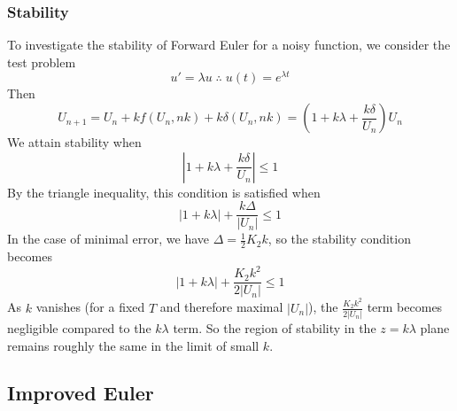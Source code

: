\documentclass[letterpaper,11pt]{article}
\newcommand*{\abs}[1]{\left| #1 \right|}
\begin{document}
\begin{flushleft}
    \subsubsection{Stability}
    To investigate the stability of Forward Euler for a noisy function, we consider the test problem
    $$u' = \lambda u \; \therefore \; u(t) = e^{\lambda t}$$
    Then
    $$U_{n+1} = U_n + kf(U_n, nk) + k\delta(U_n, nk) = \left(1 + k\lambda + \frac{k\delta}{U_n}\right)U_n$$
    We attain stability when
    $$\abs{1 + k\lambda + \frac{k\delta}{U_n}} \leq 1$$
    By the triangle inequality, this condition is satisfied when
    $$\boxed{\abs{1 + k\lambda} + \frac{k\Delta}{\abs{U_n}} \leq 1}$$
    In the case of minimal error, we have $\Delta = \frac{1}{2}K_2 k$, so the stability condition becomes
    $$\abs{1 + k\lambda} + \frac{K_2 k^2}{2\abs{U_n}} \leq 1$$
    As $k$ vanishes (for a fixed $T$ and therefore maximal $\abs{U_n}$), the $\frac{K_2 k^2}{2\abs{U_n}}$ term becomes negligible compared to the $k\lambda$ term. So the region of stability in the $z = k\lambda$ plane remains roughly the same in the limit of small $k$.

    \subsection{Improved Euler}

\end{flushleft}
\end{document}

